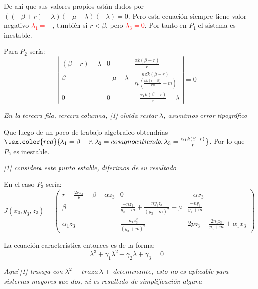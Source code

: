 \documentclass{wscpaperproc}
\theoremstyle{wsc}
\begin{document}
De ahí que sus valores propios están dados por $((-\beta+r)-\lambda)(-\mu-\lambda)(-\lambda)=0$. Pero esta ecuación siempre tiene valor negativo
\textcolor{red}{$\lambda_1=-$}, también si $r<\beta$, pero \textcolor{red}{$\lambda_3=0$}. Por tanto en $P_1$ el sistema es inestable.

\vspace*{0.5cm}

Para $P_2$ sería:
$$\left|
	\begin{array}{ccc}
		(\beta-r)-\lambda & 0            & \frac{\alpha k(\beta-r)}{r}                                      \\
		\beta             & -\mu-\lambda & \frac{n\beta k(\beta-r)}{r\mu (\frac{\beta k(r-\beta)}{r\mu}+m)} \\
		0                 & 0            & -\frac{\alpha_1 k(\beta-r)}{r}-\lambda
	\end{array}
	\right| =0$$

{\it En la tercera fila, tercera columna, [1] olvida restar $\lambda$, asumimos error tipográfico}

Que luego de un poco de trabajo algebraico obtendrías $\textcolor{red}{\lambda_1=\beta-r, \lambda_2=cosa q no entiendo, \lambda_3=\frac{\alpha_1 k(\beta-r)}{r}}$. Por lo que $P_2$ es inestable.

	{\it [1] considera este punto estable, diferimos de su resultado}


\vspace*{0.5cm}

En el caso $P_3$ sería:
$$ J(x_3, y_3, z_3) = \left(
	\begin{array}{ccc}
			r-\frac{2rx_3}{k}-\beta-\alpha z_3 & 0                                                 & -\alpha x_3                             \\
			\beta                              & \frac{-nz_3}{y_3+m}+\frac{ny_3z_3}{(y_3+m)^2}-\mu & \frac{-ny_3}{y_3+m}                     \\
			\alpha_1z_3                        & \frac{n_1z_3^2}{(y_3+m)^2}                        & 2pz_3-\frac{2n_1z_3}{y_3+m}+\alpha_1x_3
		\end{array}
	\right)$$

La ecuación característica entonces es de la forma:
$$\lambda^3+\gamma_1\lambda^2+\gamma_2\lambda+\gamma_3=0 $$

{\it Aquí [1] trabaja con $\lambda^2-\ traza\ \lambda+\ deteminante$, esto no es aplicable para sistemas mayores que dos, ni
es resultado de simplificación alguna}
\end{document}
